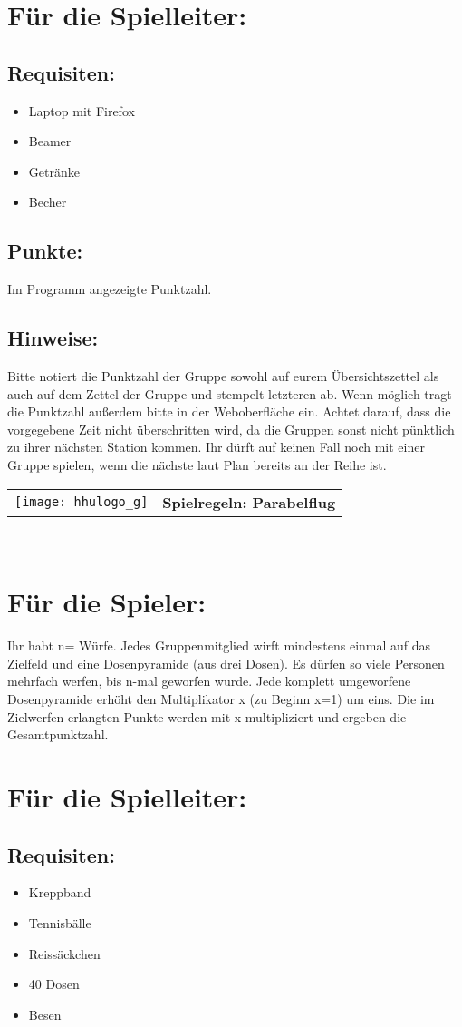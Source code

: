 \documentclass[a4paper,10pt]{article}
\def\spielh{Parabelflug}
\newcommand{\unten}{
 Bitte notiert die Punktzahl der Gruppe sowohl auf eurem Übersichtszettel als auch auf dem Zettel der Gruppe und stempelt letzteren ab. Wenn möglich tragt die Punktzahl außerdem bitte in der Weboberfläche ein.
 Achtet darauf, dass die vorgegebene Zeit nicht überschritten wird, da die Gruppen sonst nicht pünktlich zu ihrer nächsten Station kommen. Ihr dürft auf keinen Fall noch mit einer Gruppe spielen, wenn die nächste laut Plan bereits an der Reihe ist.
}
\begin{document}
\section*{Für die Spielleiter:}
\subsection*{Requisiten:} 
\begin{itemize}
 \item Laptop mit Firefox
 \item Beamer
 \item Getränke
 \item Becher
\end{itemize}
\subsection*{Punkte:}
Im Programm angezeigte Punktzahl.

\subsection*{Hinweise:}
\unten

\newpage


  \begin{tabularx}{\textwidth}{lc}
    \texttt{[image: hhulogo\_g]}
  & {\Huge \textbf{Spielregeln: \spielh}}
  \end{tabularx}\\


\Large
\section*{Für die Spieler:}
Ihr habt n=\underline{\hspace{1cm}} Würfe. Jedes Gruppenmitglied wirft mindestens einmal auf das Zielfeld und eine Dosenpyramide (aus drei Dosen). Es dürfen so viele Personen mehrfach werfen, bis n-mal geworfen wurde. Jede komplett umgeworfene Dosenpyramide erhöht den Multiplikator x (zu Beginn x=1) um eins. Die im Zielwerfen erlangten Punkte werden mit x multipliziert und ergeben die Gesamtpunktzahl.


\section*{Für die Spielleiter:}
\subsection*{Requisiten:} 
\begin{itemize}
 \item Kreppband
 \item Tennisbälle
 \item Reissäckchen
 \item 40 Dosen
 \item Besen
\end{itemize}
\end{document}
